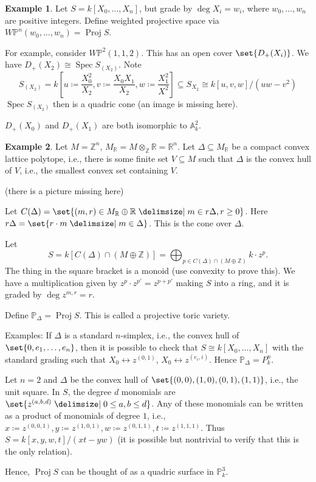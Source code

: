 \documentclass[a4paper]{amsbook}
\theoremstyle{definition}
\newtheorem*{example*}{Example}
\DeclareMathOperator\Spec{Spec}
\DeclareMathOperator\Proj{Proj}
\begin{document}
\begin{example*}
\label{WeirdGrading}
Let $S = k[X_0, \ldots, X_n]$, but grade by $\deg X_i = w_i$, where
$w_0, \ldots, w_n$ are positive integers. Define weighted projective
space via $W\mathbb{P}^n(w_0, \ldots, w_n) = \Proj S$.

For example, consider $W\mathbb{P}^2(1, 1, 2)$. This has an open cover
$\set{D_+(X_i)}$. We have $D_+(X_2) \cong \Spec S_{(X_2)}$.
Note \[ S_{(X_2)} = k[u\coloneqq\frac{X_0^2}{X_2}, v\coloneqq\frac{X_0X_1}{X_2}, w\coloneqq\frac{X_1^2}{X^2}] \subseteq S_{X_2} \cong k[u, v, w]/(uw-v^2)\]
$\Spec S_{(X_2)}$ then is a quadric cone (an image is missing here).

$D_+(X_0)$ and $D_+(X_1)$ are both isomorphic to $\mathbb{A}_k^2$.
\end{example*}

\begin{example*}
\label{LatticeExample}
Let $M = \mathbb{Z}^n$, $M_\mathbb{R} = M\otimes_{\mathbb{Z}} \mathbb{R}=\mathbb{R}^n$.
 Let $\Delta \subseteq M_\mathbb{R}$ be a compact convex lattice polytope,
 i.e., there is some finite set $V \subseteq M$ such that $\Delta$ is the convex
 hull of $V$, i.e., the smallest convex set containing $V$.

(there is a picture missing here)

Let $C(\Delta) = \set{(m, r) \in M_\mathbb{R}\oplus \mathbb{R}\given m \in r\Delta, r\geq 0}$.
Here $r\Delta = \set{r\cdot m\given m \in \Delta}$. This is the cone over $\Delta$.

Let \[S = k[C(\Delta)\cap (M\oplus \mathbb{Z})] = \bigoplus_{p \in C(\Delta)\cap(M\oplus \mathbb{Z})}k\cdot z^p .\]
The thing in the square bracket is a monoid (use convexity to prove this).
We have a multiplication given by $z^p \cdot z^{p'} = z^{p + p'}$ making
$S$ into a ring, and it is graded by $\deg z^{m, r} = r$.

Define $\mathbb{P}_{\Delta} = \Proj S$. This is called a projective
toric variety.

Examples: If $\Delta$ is a standard $n$-simplex, i.e., the convex hull of
$\set{0, e_1, \ldots, e_n}$, then it is possible to check that
$S\cong k[X_0, \ldots, X_n]$ with the standard grading such that
$X_0 \leftrightarrow z^{(0, 1)}$, $X_0 \leftrightarrow z^{(e_i, i)}$. Hence
$\mathbb{P}_\Delta = P^n_k$.

Let $n = 2$ and $\Delta$ be the convex hull of $\set{(0, 0), (1, 0), (0, 1), (1, 1)}$,
i.e., the unit square. In $S$, the degree $d$ monomials are $\set{z^{(a, b, d)}\given 0\leq a, b\leq d}$.
Any of these monomials can be written as a product of monomials of degree $1$, i.e.,
$x\coloneqq z^{(0, 0, 1)}, y\coloneqq z^{(1, 0, 1)}, w\coloneqq z^{(0, 1, 1)}, t\coloneqq z^{(1, 1, 1)}$.
Thus $S = k[x, y, w, t]/(xt-yw)$ (it is possible but nontrivial to verify that this is
the only relation).

Hence, $\Proj S$ can be thought of as a quadric surface in $\mathbb{P}^3_k$.
\end{example*}
\end{document}
